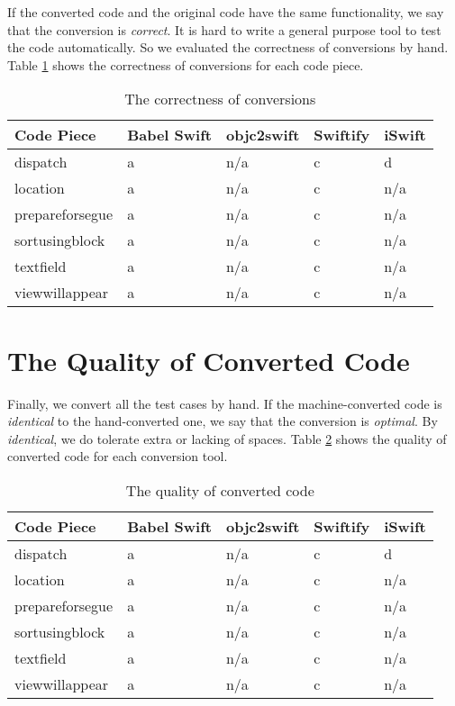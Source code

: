 \documentclass{sfuthesis}
\begin{document}
If the converted code and the original code have the same functionality, we say that the conversion is \emph{correct}. It is hard to write a general purpose tool to test the code automatically. So we evaluated the correctness of conversions by hand. Table \ref{table:correctness} shows the correctness of conversions for each code piece.

\begin{table}[H]
\begin{center}
\begin{tabular}{|l|l|l|l|l|}
\hline
\textbf{Code Piece} & Babel Swift & objc2swift & Swiftify & iSwift \\
\hline
dispatch        & a & n/a & c & d \\
location        & a & n/a & c & n/a \\
prepareforsegue & a & n/a & c & n/a \\
sortusingblock  & a & n/a & c & n/a \\
textfield       & a & n/a & c & n/a \\
viewwillappear  & a & n/a & c & n/a \\
\hline
\end{tabular}
\end{center}
\caption{The correctness of conversions}
\label{table:correctness}
\end{table}

\section{The Quality of Converted Code}

Finally, we convert all the test cases by hand. If the machine-converted code is \emph{identical} to the hand-converted one, we say that the conversion is \emph{optimal}. By \emph{identical}, we do tolerate extra or lacking of spaces. Table \ref{table:quality} shows the quality of converted code for each conversion tool.

\begin{table}[H]
\begin{center}
\begin{tabular}{|l|l|l|l|l|}
\hline
\textbf{Code Piece} & Babel Swift & objc2swift & Swiftify & iSwift \\
\hline
dispatch        & a & n/a & c & d \\
location        & a & n/a & c & n/a \\
prepareforsegue & a & n/a & c & n/a \\
sortusingblock  & a & n/a & c & n/a \\
textfield       & a & n/a & c & n/a \\
viewwillappear  & a & n/a & c & n/a \\
\hline
\end{tabular}
\end{center}
\caption{The quality of converted code}
\label{table:quality}
\end{table}
\end{document}
